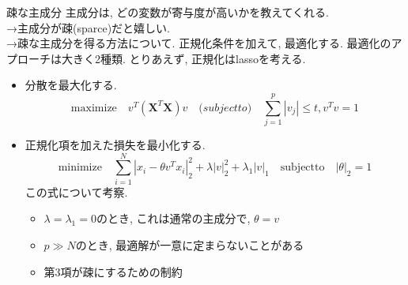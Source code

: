 \documentclass[dvipdfmx,8pt]{beamer}
\begin{document}
  \begin{frame}{疎な主成分}
    主成分は, どの変数が寄与度が高いかを教えてくれる. \\
    →主成分が疎(sparce)だと嬉しい. \\
    →疎な主成分を得る方法について. 正規化条件を加えて, 最適化する.
    最適化のアプローチは大きく2種類. とりあえず, 正規化はlassoを考える.
    \begin{itemize}
      \item 分散を最大化する.
        \[
          \mathrm{maximize} \quad v^T(\textbf{X}^T\textbf{X})v \quad \mathrm(subject to) \quad \sum_{j=1}^p|v_j| \le t, v^Tv=1
        \]
      \item 正規化項を加えた損失を最小化する.
        \[
          \mathrm{minimize} \quad \sum_{i=1}^N|x_i-\theta v^Tx_i|_2^2+\lambda|v|_2^2+\lambda_1|v|_1 \quad \mathrm{subject to} \quad |\theta|_2=1
        \]
        この式について考察.
        \begin{itemize}
          \item $\lambda=\lambda_1=0$のとき, これは通常の主成分で, $\theta=v$
          \item $p \gg N$のとき, 最適解が一意に定まらないことがある
          \item 第3項が疎にするための制約
        \end{itemize}
    \end{itemize}
  \end{frame}
\end{document}
